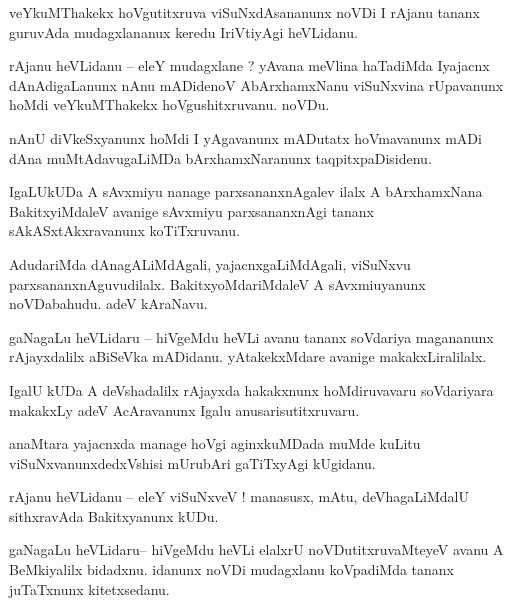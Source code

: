 \documentclass{article}
\begin{document}
\begin{mn}%
veYkuMThakekx hoVgutitxruva viSuNxdAsananunx noVDi I rAjanu tananx guruvAda mudagxlananux keredu 
IriVtiyAgi heVLidanu.
\end{mn}

\begin{mn}%
rAjanu heVLidanu -- eleY mudagxlane ? yAvana meVlina haTadiMda Iyajacnx dAnAdigaLanunx nAnu 
mADidenoV AbArxhamxNanu viSuNxvina rUpavanunx hoMdi veYkuMThakekx hoVgushitxruvanu. noVDu.
\end{mn}

\begin{mn}%
nAnU diVkeSxyanunx hoMdi I yAgavanunx mADutatx hoVmavanunx mADi dAna muMtAdavugaLiMDa 
bArxhamxNaranunx taqpitxpaDisidenu.
\end{mn}

\begin{mn}%
IgaLUkUDa A sAvxmiyu nanage parxsananxnAgalev ilalx A bArxhamxNana BakitxyiMdaleV avanige sAvxmiyu 
parxsananxnAgi tananx sAkASxtAkxravanunx koTiTxruvanu.
\end{mn}

\begin{mn}%
AdudariMda dAnagALiMdAgali, yajacnxgaLiMdAgali, viSuNxvu parxsananxnAguvudilalx. 
BakitxyoMdariMdaleV A sAvxmiuyanunx noVDabahudu. adeV kAraNavu.
\end{mn}

\begin{mn}%
gaNagaLu heVLidaru -- hiVgeMdu heVLi avanu tananx soVdariya magananunx rAjayxdalilx aBiSeVka 
mADidanu. yAtakekxMdare avanige makakxLiralilalx.
\end{mn}

\begin{mn}%
IgalU kUDa A deVshadalilx rAjayxda hakakxnunx hoMdiruvavaru soVdariyara makakxLy adeV AcAravanunx 
Igalu anusarisutitxruvaru.
\end{mn}

\begin{mn}%
anaMtara yajacnxda manage hoVgi aginxkuMDada muMde kuLitu viSuNxvanunxdedxVshisi mUrubAri 
gaTiTxyAgi kUgidanu.
\end{mn}

\begin{mn}%
rAjanu heVLidanu -- eleY viSuNxveV ! manasusx, mAtu, deVhagaLiMdalU sithxravAda Bakitxyanunx kUDu.
\end{mn}

\begin{mn}%
gaNagaLu heVLidaru-- hiVgeMdu heVLi elalxrU noVDutitxruvaMteyeV avanu A BeMkiyalilx bidadxnu. 
idanunx noVDi mudagxlanu koVpadiMda tananx juTaTxnunx kitetxsedanu.
\end{mn}
\end{document}
